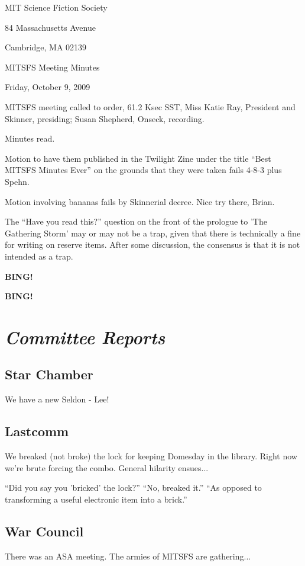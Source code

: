 \documentclass[10pt]{article}
\newcommand{\bing}{{\bf BING!} }
\newcommand{\goto}[1]{\bing \vskip 12pt \section*{{\em{#1}}}}
\newcommand{\ps}{ plus Spehn\xspace}
\begin{document}
\begin{center}

MIT Science Fiction Society

84 Massachusetts Avenue

Cambridge, MA 02139

\vspace{12pt}

MITSFS Meeting Minutes

Friday, October 9, 2009

\end{center}

\vspace{18pt}

\setlength{\parskip}{6pt}

\noindent
MITSFS meeting called to order, 61.2 Ksec SST,
Miss Katie Ray, President and Skinner, presiding; Susan Shepherd, Onseck, recording.

Minutes read.

Motion to have them published in the Twilight Zine under the title ``Best MITSFS Minutes Ever'' on the grounds that they were taken fails 4-8-3\ps.

Motion involving bananas fails by Skinnerial decree. Nice try there, Brian.

The ``Have you read this?'' question on the front of the prologue to 'The Gathering Storm' may or may not be a trap, given that there is technically a fine for writing on reserve items. After some discussion, the consensus is that it is not intended as a trap. 

\bing

\goto{Committee Reports}

\subsection*{Star Chamber}
We have a new Seldon - Lee!

\subsection*{Lastcomm}
We breaked (not broke) the lock for keeping Domesday in the library. Right now we're brute forcing the combo. General hilarity ensues...

``Did you say you 'bricked' the lock?'' ``No, breaked it.'' ``As opposed to transforming a useful electronic item into a brick.''

\subsection*{War Council}
There was an ASA meeting. The armies of MITSFS are gathering...
\end{document}
